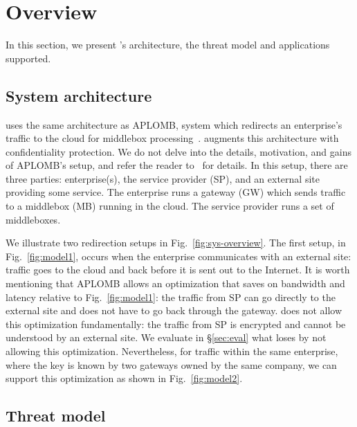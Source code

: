 


     
\section{Overview}\label{sec:overview}








In this section, we present \sys's architecture, the threat model and applications supported.


\subsection{System architecture}

\sys uses the same  architecture as APLOMB, system which redirects an enterprise's traffic to the cloud for middlebox processing~\cite{aplomb}. \sys augments this architecture with confidentiality protection.
We do not delve into the details, motivation, and gains of APLOMB's setup, and refer the reader to~\cite{aplomb} for details. 
In this setup, there are three parties: enterprise(s), the service provider (SP), and an external site providing
some service. The enterprise runs a gateway (GW) which sends traffic to a middlebox (MB) running in the cloud.
The service provider runs a set of middleboxes. 

We illustrate two redirection setups in Fig.~\ref{fig:sys-overview}.  The first setup, in Fig.~\ref{fig:model1},  occurs when the enterprise communicates with an external site: traffic goes to the cloud and back before it is sent out to the Internet. 
It is worth mentioning that APLOMB allows an optimization that saves on bandwidth and latency relative to Fig.~\ref{fig:model1}: the traffic from SP can go directly to the external site and does not have to go back through the gateway. \sys does not allow this optimization fundamentally: the traffic from SP is encrypted and cannot be understood by an external site. We evaluate in \S\ref{sec:eval} what \sys loses by not allowing this optimization. 
Nevertheless, for traffic within the same enterprise, where the key is known by two gateways owned by the same company, we can support this optimization as shown in Fig.~\ref{fig:model2}.



\subsection{Threat model}

